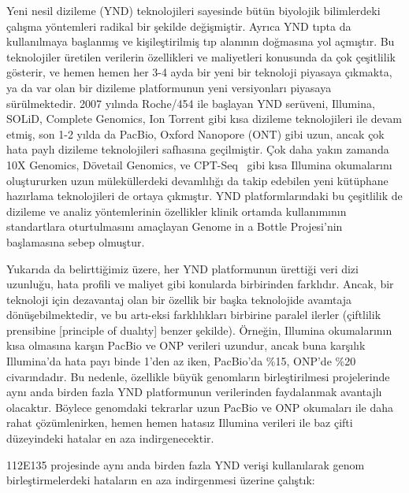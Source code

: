\documentclass[11pt]{article}
\begin{document}
\noindent
Yeni nesil dizileme (YND) teknolojileri sayesinde bütün biyolojik bilimlerdeki çalışma yöntemleri radikal bir şekilde değişmiştir. Ayrıca YND tıpta da kullanılmaya başlanmış ve kişileştirilmiş tıp alanının doğmasına yol açmıştır. Bu teknolojiler üretilen verilerin özellikleri ve maliyetleri konusunda da çok çeşitlilik gösterir, ve hemen hemen her 3-4 ayda bir yeni bir teknoloji piyasaya çıkmakta, ya da var olan bir dizileme platformunun yeni versiyonları piyasaya sürülmektedir. 2007 yılında Roche/454 ile başlayan YND serüveni, Illumina, SOLiD, Complete Genomics, Ion Torrent gibi kısa dizileme teknolojileri ile devam etmiş, son 1-2 yılda da PacBio, Oxford Nanopore (ONT) gibi uzun, ancak çok hata paylı dizileme teknolojileri safhasına geçilmiştir. Çok daha yakın zamanda 10X Genomics, Dövetail Genomics, ve CPT-Seq~\cite{Adey2014,Amini2014} gibi kısa Illumina okumalarını oluştururken uzun müleküllerdeki devamlılığı da takip edebilen yeni kütüphane hazırlama teknolojileri de ortaya çıkmıştır. YND platformlarındaki bu çeşitlilik de dizileme ve analiz yöntemlerinin özellikler klinik ortamda kullanımının standartlara oturtulmasını amaçlayan Genome in a Bottle Projesi'nin~\cite{Zook2014} başlamasına sebep olmuştur.

Yukarıda da belirttiğimiz üzere, her YND platformunun ürettiği veri dizi uzunluğu, hata profili ve maliyet gibi konularda birbirinden farklıdır. Ancak, bir teknoloji için dezavantaj olan bir özellik bir başka teknolojide avamtaja dönüşebilmektedir, ve bu artı-eksi farklılıkları birbirine paralel ilerler (çiftlilik prensibine [principle of dualıty] benzer şekilde). Örneğin, Illumina okumalarının kısa olmasına karşın PacBio ve ONP verileri uzundur, ancak buna karşılık Illumina'da hata payı binde 1'den az iken, PacBio'da \%15, ONP'de \%20 civarındadır. Bu nedenle, özellikle büyük genomların birleştirilmesi projelerinde aynı anda birden fazla YND platformunun verilerinden faydalanmak avantajlı olacaktır. Böylece genomdaki tekrarlar uzun PacBio ve ONP okumaları ile daha rahat çözümlenirken, hemen hemen hatasız Illumina verileri ile baz çifti düzeyindeki hatalar en aza indirgenecektir.

112E135 projesinde aynı anda birden fazla YND verişi kullanılarak genom birleştirmelerdeki hataların en aza indirgenmesi üzerine çalıştık:
\end{document}
